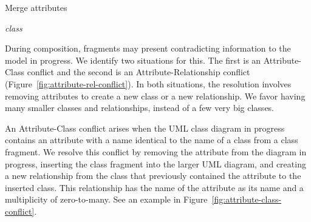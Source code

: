 \documentclass[sigconf]{acmart}
\begin{document}
\begin{algorithm}
\caption{Merge attributes} \label{alg:merge-attributes}
\begin{algorithmic}[1]

    \EndIf
\Else{}
\EndIf
\State \Return \textit{class}
\end{algorithmic}
\end{algorithm}

During composition, fragments may present contradicting information to the model in progress. We identify two situations for this. The first is an Attribute-Class conflict and the second is an Attribute-Relationship conflict (Figure~\ref{fig:attribute-rel-conflict}). In both situations, the resolution involves removing attributes to create a new class or a new relationship. We favor having many smaller classes and relationships, instead of a few very big classes.

An Attribute-Class conflict arises when the UML class diagram in progress contains an attribute with a name identical to the name of a class from a class fragment. We resolve this conflict by removing the attribute from the diagram in progress, inserting the class fragment into the larger UML diagram, and creating a new relationship from the class that previously contained the attribute to the inserted class. This relationship has the name of the attribute as its name and a multiplicity of zero-to-many. See an example in Figure~\ref{fig:attribute-class-conflict}.
\end{document}
